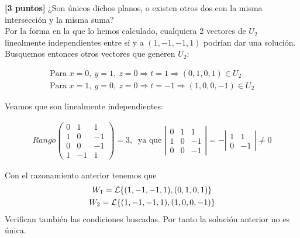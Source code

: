 \documentclass[12pt]{article}
\begin{document}
    \begin{ejercicio}\textbf{[3 puntos]}
    ¿Son únicos dichos planos, o existen otros dos con la misma intersección y la misma suma?\\

    Por la forma en la que lo hemos calculado, cualquiera 2 vectores de $U_2$ linealmente independientes entre sí y a $(1,-1,-1,1)$ podrían dar una solución.
    Busquemos entonces otros vectores que generen $U_2$:

    \begin{gather*}
        \text{Para }x=0,\ y=1,\ z=0 \Rightarrow t=1 \Rightarrow (0,1,0,1)\in U_2\\
        \text{Para }x=1,\ y=0,\ z=0 \Rightarrow t=-1 \Rightarrow (1,0,0,-1)\in U_2
    \end{gather*}   

    Veamos que son linealmente independientes:

    \begin{gather*}
        Rango\left(\begin{array}{rrr}0&1&1\\1&0&-1\\0&0&-1\\1&-1&1\end{array}\right)=3,\  \text{ ya que }
        \left|\begin{array}{rrr}0&1&1\\1&0&-1\\0&0&-1\end{array}\right|=
        - \left|\begin{array}{rr}1&1\\0&-1\end{array}\right|\neq 0
    \end{gather*}

    Con el razonamiento anterior tenemos que
    \begin{gather*}
        W_1=\mathcal{L}\{(1,-1,-1,1),(0,1,0,1)\}\\
        W_2=\mathcal{L}\{(1,-1,-1,1),(1,0,0,-1)\}
    \end{gather*}
    Verifican también las condiciones buscadas. Por tanto la solución anterior no es única.

    \end{ejercicio}
\end{document}
